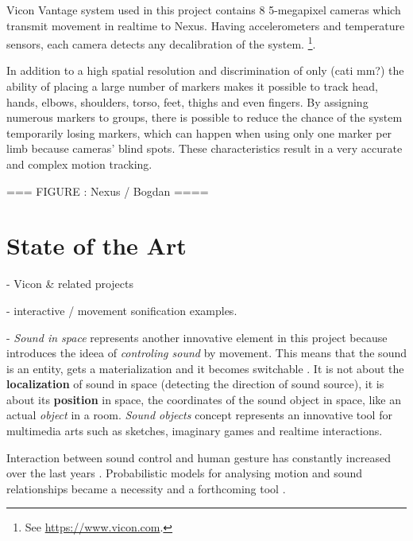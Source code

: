 \documentclass{nime-alternate}
\begin{document}
Vicon Vantage system used in this project contains 8 5-megapixel cameras which transmit movement in realtime to Nexus. Having accelerometers and temperature sensors, each camera detects any decalibration of the system. \footnote{See  \url{https://www.vicon.com}.}.

In addition to a high spatial resolution and discrimination of only (cati mm?) the ability of placing a large number of markers makes it possible to track head, hands, elbows, shoulders, torso, feet, thighs and even fingers. By assigning numerous markers to groups, there is possible to  reduce the chance of the system temporarily losing markers, which can happen when using only one marker per limb because cameras' blind spots. These characteristics result in a very accurate and complex motion tracking.

=== FIGURE : Nexus / Bogdan ====


\section{State of the Art}

- Vicon \& related projects

- interactive / movement sonification examples\cite{hermann2011sonification}.

- \textit{Sound in space} represents another innovative element in this project because introduces the ideea of \textit{controling sound} by movement.
This means that the sound is an entity, gets a materialization and it becomes switchable \cite{soundunseen}. It is not about the \textbf{localization} of sound in space (detecting the direction of sound source), it is about its \textbf{position} in space, the coordinates of the sound object in space, like an actual \textit{object} in a room. \textit{Sound objects} concept represents an innovative tool for multimedia arts such as sketches, imaginary games and realtime interactions.

Interaction between sound control and human gesture has constantly increased over the last years \cite{Gestureanalysis}. Probabilistic models for analysing motion and sound relationships became a necessity and a forthcoming tool \cite{probabilisticmodels}.
\end{document}
